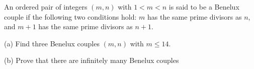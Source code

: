 An ordered pair of integers $(m,n)$ with $1<m<n$ is said to be a Benelux couple if the following two conditions hold: $m$ has the same prime divisors as $n$,  and $m+1$ has the same prime divisors as $n+1$.

(a) Find three Benelux couples $(m,n)$ with $m\leqslant 14$.

(b) Prove that there are infinitely many Benelux couples